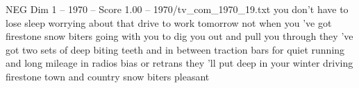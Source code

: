 \begin{textsample}{NEG Dim 1 – 1970 – Score 1.00 – 1970/tv\_com\_1970\_19.txt}  \label{ex:f1_neg_066}
you don't have to lose sleep worrying about that drive to work tomorrow not when you 've got firestone snow biters going with you to dig you out and pull you through they 've got two sets of deep biting teeth and in between traction bars for quiet running and long mileage in radios bias or retrans they 'll put deep in your winter driving firestone town and country snow biters pleasant

\end{textsample}
